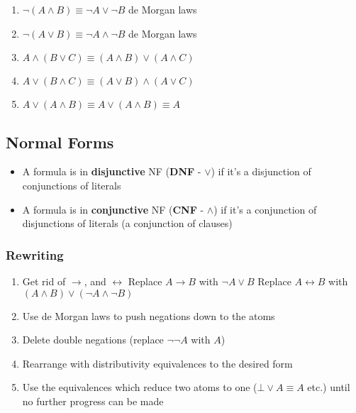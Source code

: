 \documentclass[a4paper, 12pt]{article}
\begin{document}
\begin{enumerate}[1.]
                \item $\neg (A \land B) \equiv \neg A \lor \neg B$ \hfill de Morgan laws
                \item $\neg (A \lor B) \equiv \neg A \land \neg B$ \hfill de Morgan laws
                \item $A \land (B \lor C) \equiv (A \land B) \lor (A \land C)$
                \item $A \lor (B \land C) \equiv (A \lor B) \land (A \lor C)$
                \item $A \lor (A \land B) \equiv A \lor (A \land B) \equiv A$
            \end{enumerate}
        \subsection*{Normal Forms}
            \begin{itemize}
                \itemsep0em
                \item A formula is in \textbf{disjunctive} NF (\textbf{DNF} - $\lor$) if it's a disjunction of conjunctions of literals
                \item A formula is in \textbf{conjunctive} NF (\textbf{CNF} - $\land$) if it's a conjunction of disjunctions of literals (a conjunction of clauses)
            \end{itemize}
            \subsubsection*{Rewriting}
                \begin{enumerate}[1.]
                    \itemsep0em
                    \item Get rid of $\rightarrow$, and $\leftrightarrow$
                        \subitem Replace $A \rightarrow B$ with $\neg A \lor B$
                        \subitem Replace $A \leftrightarrow B$ with $(A \land B) \lor (\neg A \land \neg B)$
                    \item Use de Morgan laws to push negations down to the atoms
                    \item Delete double negations (replace $\neg \neg A$ with $A$)
                    \item Rearrange with distributivity equivalences to the desired form
                    \item Use the equivalences which reduce two atoms to one ($\bot \lor A \equiv A$ etc.) until no further progress can be made
                \end{enumerate}
\end{document}
